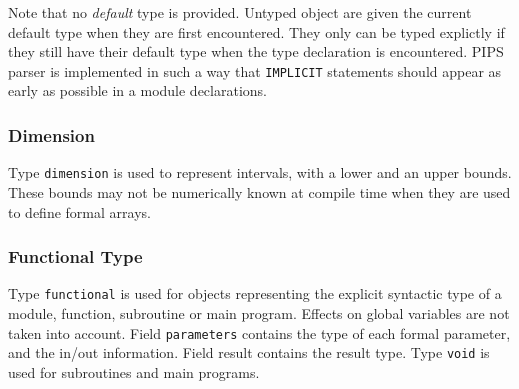 \iffalse
Le domaine \verb/basic/ permet de repre'senter un type Fortran tel que
INTEGER ou REAL. La valeur de ce domaine donne la longueur en octets de
la zone me'moire occupe'e par une variable de ce type.
\fi

Note that no {\em default} type is provided. Untyped object are given
the current default type when they are first encountered. They only can
be typed explictly if they still have their default type when the type
declaration is encountered. PIPS parser is implemented in such a way
that {\tt IMPLICIT} statements should appear as early as possible in a
module declarations.

\subsubsection{Dimension}
\label{subsubsection-dimension}


Type {\tt dimension} is used to represent intervals, with a lower and
an upper bounds. These bounds may not be numerically known at compile
time when they are used to define formal arrays.

\iffalse
Le domaine \verb/dimension/ permet de repre'senter une dimension d'un
tableau, c'est-a`-dire un couple borne infe'rieure -- sous-domaine
\verb/lower/ -- borne supe'rieure -- sous-domaine \verb/upper/.
\fi

\subsubsection{Functional Type}
\label{subsubsection-functional}


Type {\tt functional} is used for objects representing the explicit
syntactic type of a module, function, subroutine or main
program. Effects on global variables are not taken into account. Field
{\tt parameters} contains the type of each formal parameter, and the
in/out information. Field {\ttt result} contains the result type. Type
{\tt void} is used for subroutines and main programs.

\iffalse
Le domaine \verb/functional/ repre'sente le type d'un module,
c'est-a`-dire une fonction, une subroutine ou un programme principal. Le
sous-domaine \verb/parameters/ donne le type et le mode de passage de
chaque parame`tre, et le sous-domaine \verb/result/ donne le type du
re'sultat. Ce dernier type vaut \verb/void/ pour les subroutines et les
programmes principaux.
\fi

